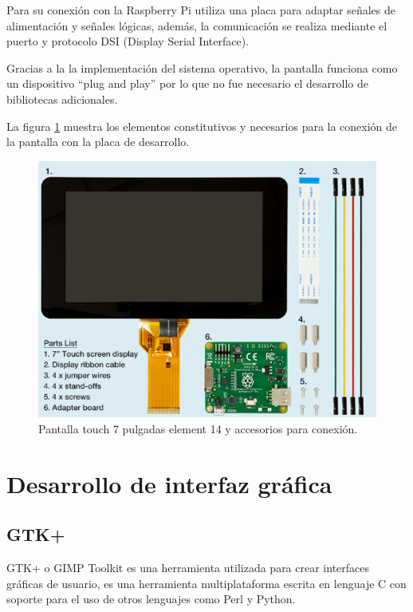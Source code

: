 Para su conexión con la Raspberry Pi utiliza una placa para adaptar señales de alimentación y señales lógicas, además, la comunicación se realiza mediante el puerto y protocolo  DSI (Display Serial Interface).

Gracias a la la implementación del sistema operativo, la pantalla funciona como un dispositivo “plug and play” por lo que no fue necesario el desarrollo de bibliotecas adicionales.

La figura \ref{fig:pantalla} muestra los elementos constitutivos y necesarios para la conexión de la pantalla con la placa de desarrollo.

\begin{figure}[h]
	\centering
	\includegraphics[scale=.5]{./Figures/pantalla.png}
	\caption{Pantalla touch 7 pulgadas element 14 y accesorios para conexión.}
	\label{fig:pantalla}
\end{figure}

\section{Desarrollo de interfaz gráfica}
 \subsection{GTK+}
GTK+ o GIMP Toolkit es una herramienta utilizada para crear interfaces gráficas de usuario, es una herramienta multiplataforma escrita en lenguaje C con soporte para el uso de otros lenguajes como Perl y Python.

